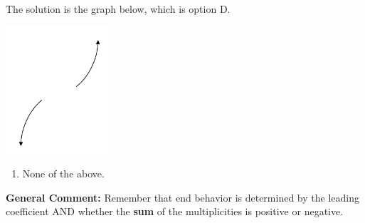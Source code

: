 \documentclass{extbook}[14pt]
\begin{document}
\begin{enumerate}
{The solution is the graph below, which is option D.
\begin{center}
    \includegraphics[width=0.3\textwidth]{../Figures/polyEndBehaviorDC.png}
\end{center}\begin{enumerate}[label=\Alph*.]
\item None of the above.\end{enumerate}
\textbf{General Comment:} Remember that end behavior is determined by the leading coefficient AND whether the \textbf{sum} of the multiplicities is positive or negative.
}
\end{enumerate}
\end{document}
